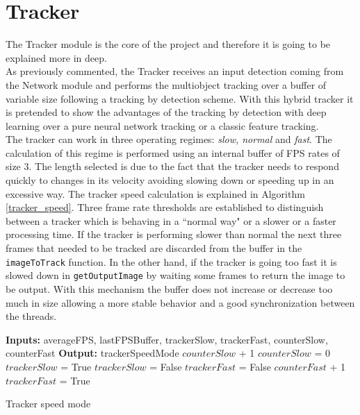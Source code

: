\section{Tracker}\label{tracker_algorithms}
The Tracker module is the core of the project and therefore it is going to be explained more in deep.\\
As previously commented, the Tracker receives an input detection coming from the Network module and performs the multiobject tracking over a buffer of variable size following a tracking by detection scheme. With this hybrid tracker it is pretended to show the advantages of the tracking by detection with deep learning over a pure neural network tracking or a classic feature tracking.\\
The tracker can work in three operating regimes: \textit{slow, normal} and \textit{fast}. The calculation of this regime is performed using an internal buffer of FPS rates of size 3. The length selected is due to the fact that the tracker needs to respond quickly to changes in its velocity avoiding slowing down or speeding up in an excessive way. The tracker speed calculation is explained in Algorithm \ref{tracker_speed}. Three frame rate thresholds are established to distinguish between a tracker which is behaving in a ``normal way" or a slower or a faster processing time. If the tracker is performing slower than normal the next three frames that needed to be tracked are discarded from the buffer in the \texttt{imageToTrack} function. In the other hand, if the tracker is going too fast it is slowed down in \texttt{getOutputImage} by waiting some frames to return the image to be output. With this mechanism the buffer does not increase or decrease too much in size allowing a more stable behavior and a good synchronization between the threads.
\begin{algorithmic}[H]
\begin{algorithm}
\State \textbf{Inputs:} averageFPS, lastFPSBuffer, trackerSlow, trackerFast, counterSlow, counterFast
\State \textbf{Output:} trackerSpeedMode
    \State $counterSlow$ + 1
        \State $counterSlow$ = 0
        \State $trackerSlow$ = True
    \EndIf
{}
    \State $trackerSlow$ = False
    \State $trackerFast$ = False
    \State $counterFast$ + 1
\State $trackerFast$ = True
\EndIf  
\EndProcedure
\caption{Tracker speed mode}\label{tracker_speed}
\end{algorithm}
\end{algorithmic}

